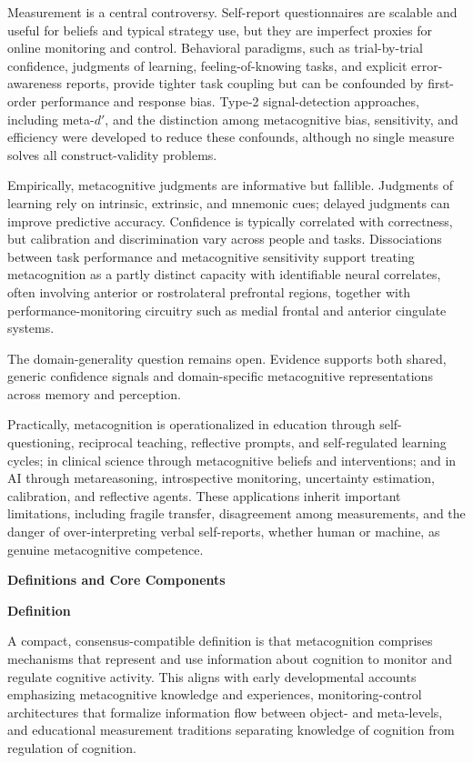 \documentclass{book}
\providecommand{\ProjectDeepHeading}[2]{%
    \par\medskip\noindent\textbf{#2}\par\smallskip
}
\begin{document}
   Measurement is a central controversy. Self-report questionnaires are scalable and useful for beliefs and typical strategy use, but they are imperfect proxies for online monitoring and control. Behavioral paradigms, such as trial-by-trial confidence, judgments of learning, feeling-of-knowing tasks, and explicit error-awareness reports, provide tighter task coupling but can be confounded by first-order performance and response bias. Type-2 signal-detection approaches, including meta-$d'$, and the distinction among metacognitive bias, sensitivity, and efficiency were developed to reduce these confounds, although no single measure solves all construct-validity problems.

   Empirically, metacognitive judgments are informative but fallible. Judgments of learning rely on intrinsic, extrinsic, and mnemonic cues; delayed judgments can improve predictive accuracy. Confidence is typically correlated with correctness, but calibration and discrimination vary across people and tasks. Dissociations between task performance and metacognitive sensitivity support treating metacognition as a partly distinct capacity with identifiable neural correlates, often involving anterior or rostrolateral prefrontal regions, together with performance-monitoring circuitry such as medial frontal and anterior cingulate systems.

   The domain-generality question remains open. Evidence supports both shared, generic confidence signals and domain-specific metacognitive representations across memory and perception.

   Practically, metacognition is operationalized in education through self-questioning, reciprocal teaching, reflective prompts, and self-regulated learning cycles; in clinical science through metacognitive beliefs and interventions; and in AI through metareasoning, introspective monitoring, uncertainty estimation, calibration, and reflective agents. These applications inherit important limitations, including fragile transfer, disagreement among measurements, and the danger of over-interpreting verbal self-reports, whether human or machine, as genuine metacognitive competence.

   \ProjectDeepHeading{5}{Definitions and Core Components}

   \ProjectDeepHeading{6}{Definition}

   A compact, consensus-compatible definition is that metacognition comprises mechanisms that represent and use information about cognition to monitor and regulate cognitive activity. This aligns with early developmental accounts emphasizing metacognitive knowledge and experiences, monitoring-control architectures that formalize information flow between object- and meta-levels, and educational measurement traditions separating knowledge of cognition from regulation of cognition.
\end{document}

